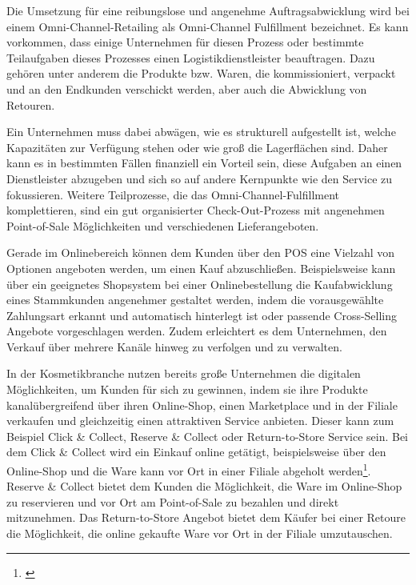 Die Umsetzung für eine reibungslose und angenehme Auftragsabwicklung wird bei einem Omni-Channel-Retailing als Omni-Channel Fulfillment bezeichnet. Es kann vorkommen, dass einige Unternehmen für diesen Prozess oder bestimmte Teilaufgaben dieses Prozesses einen Logistikdienstleister beauftragen. Dazu gehören unter anderem die Produkte bzw. Waren, die kommissioniert, verpackt und an den Endkunden verschickt werden, aber auch die Abwicklung von Retouren.
\newline

Ein Unternehmen muss dabei abwägen, wie es strukturell aufgestellt ist, welche Kapazitäten zur Verfügung stehen oder wie groß die Lagerflächen sind. Daher kann es in bestimmten Fällen finanziell ein Vorteil sein, diese Aufgaben an einen Dienstleister abzugeben und sich so auf andere Kernpunkte wie den Service zu fokussieren. Weitere Teilprozesse, die das Omni-Channel-Fulfillment komplettieren, sind ein gut organisierter Check-Out-Prozess mit angenehmen Point-of-Sale Möglichkeiten und verschiedenen Lieferangeboten.
\newline

Gerade im Onlinebereich können dem Kunden über den POS eine Vielzahl von Optionen angeboten werden, um einen Kauf abzuschließen. Beispielsweise kann über ein geeignetes Shopsystem bei einer Onlinebestellung die Kaufabwicklung eines Stammkunden angenehmer gestaltet werden, indem die vorausgewählte Zahlungsart erkannt und automatisch hinterlegt ist oder passende Cross-Selling Angebote vorgeschlagen werden. Zudem erleichtert es dem Unternehmen, den Verkauf über mehrere Kanäle hinweg zu verfolgen und zu verwalten.
\newline

In der Kosmetikbranche nutzen bereits große Unternehmen die digitalen Möglichkeiten, um Kunden für sich zu gewinnen, indem sie ihre Produkte kanalübergreifend über ihren Online-Shop, einen Marketplace und in der Filiale verkaufen und gleichzeitig einen attraktiven Service anbieten. Dieser kann zum Beispiel Click \& Collect, Reserve \& Collect oder Return-to-Store Service sein. Bei dem Click \& Collect wird ein Einkauf online getätigt, beispielsweise über den Online-Shop und die Ware kann vor Ort in einer Filiale abgeholt werden\footnote{\autocite [S. 56] {Vallee2018}}.
Reserve \& Collect bietet dem Kunden die Möglichkeit, die Ware im Online-Shop zu reservieren und vor Ort am Point-of-Sale zu bezahlen und direkt mitzunehmen. Das Return-to-Store Angebot bietet dem Käufer bei einer Retoure die Möglichkeit, die online gekaufte Ware vor Ort in der Filiale umzutauschen.

